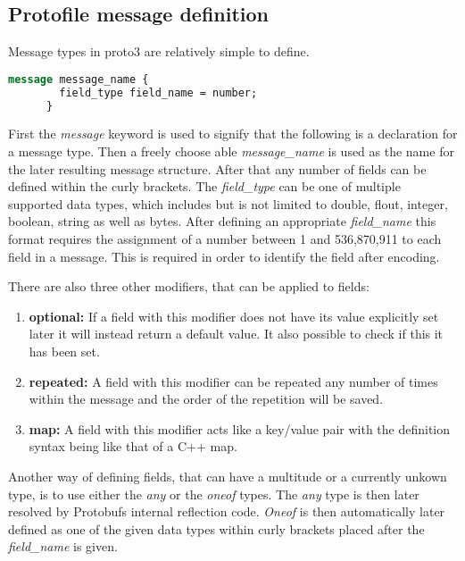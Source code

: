 \subsection{Protofile message definition}

Message types in proto3 are relatively simple to define.

\begin{minipage}{\textwidth}
\begin{lstlisting}[language=ProtoBuf, caption=Message definition syntax in Protofiles]
    message message_name {
        field_type field_name = number;
      }
\end{lstlisting}
\end{minipage}

First the \textit{message} keyword is used to signify that the following is a declaration for a message type. Then a freely choose able \textit{message\_name} is 
used as the name for the later resulting message structure. After that any number of fields can be defined within the curly brackets. The \textit{field\_type} can be
one of multiple supported data types, which includes but is not limited to double, flout, integer, boolean, string as well as bytes. After defining an appropriate
\textit{field\_name} this format requires the assignment of a number between 1 and 536,870,911 to each field in a message. This is required in order to identify
the field after encoding.

There are also three other modifiers, that can be applied to fields:

\begin{enumerate}
    \item \textbf{optional:} If a field with this modifier does not have its value explicitly set later it will instead return a default value. It also possible to check if this it has been set.
    \item \textbf{repeated:} A field with this modifier can be repeated any number of times within the message and the order of the repetition will be saved.
    \item \textbf{map:} A field with this modifier acts like a key/value pair with the definition syntax being like that of a C++ map.
\end{enumerate}

Another way of defining fields, that can have a multitude or a currently unkown type, is to use either the \textit{any} or the \textit{oneof} types.
The \textit{any} type is then later resolved by Protobufs internal reflection code.
\textit{Oneof} is then automatically later defined as one of the given data types within curly brackets placed after the \textit{field\_name} is given.

